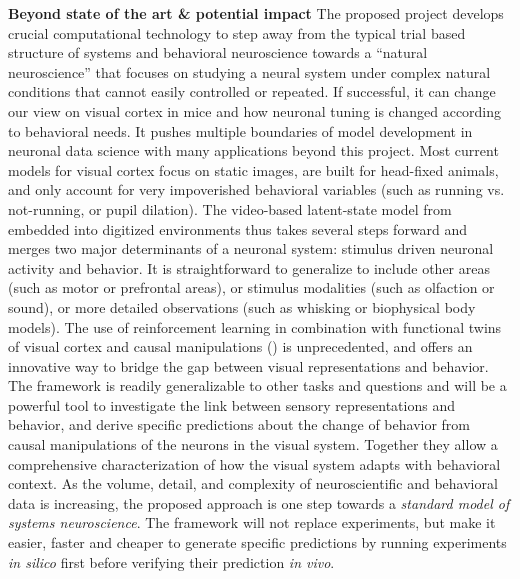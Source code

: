 \documentclass[COG,11pt]{ercgrant}
\begin{document}
\textbf{Beyond state of the art \& potential impact} 
The proposed project develops crucial computational technology to step away from the typical trial based structure of systems and behavioral neuroscience towards a ``natural neuroscience'' that focuses on studying a neural system under complex natural conditions that cannot easily controlled or repeated. 
If successful, it can change our view on visual cortex in mice and how neuronal tuning is changed according to behavioral needs. 
It pushes multiple boundaries of model development in neuronal data science with many applications beyond this project.  Most current models for visual cortex focus on static images, are built for head-fixed animals, and only account for very impoverished behavioral variables (such as running vs. not-running, or pupil dilation). The video-based latent-state model from  embedded into digitized environments thus takes several steps forward and merges two major determinants of a neuronal system: stimulus driven neuronal activity and behavior. It is straightforward to generalize to include other areas (such as motor or prefrontal areas), or stimulus modalities (such as olfaction or sound), or more detailed observations (such as whisking or biophysical body models). 
 The use of reinforcement learning in combination with functional twins of visual cortex and causal manipulations () is unprecedented, and offers an innovative way to bridge the gap between visual representations and behavior. The framework is readily generalizable to other tasks and questions and will be a powerful tool to investigate the link between sensory representations and behavior, and derive specific predictions about the change of behavior from causal manipulations of the neurons in the visual system.
 Together they allow a comprehensive characterization of how the visual system adapts with behavioral context. As the volume, detail, and complexity of neuroscientific and behavioral data is increasing, the proposed approach is one step towards a \textit{standard model of systems neuroscience}.
The framework will not replace experiments, but make it easier, faster and cheaper to generate specific predictions by running experiments \textit{in silico} first before verifying their prediction \textit{in vivo}.
\end{document}
